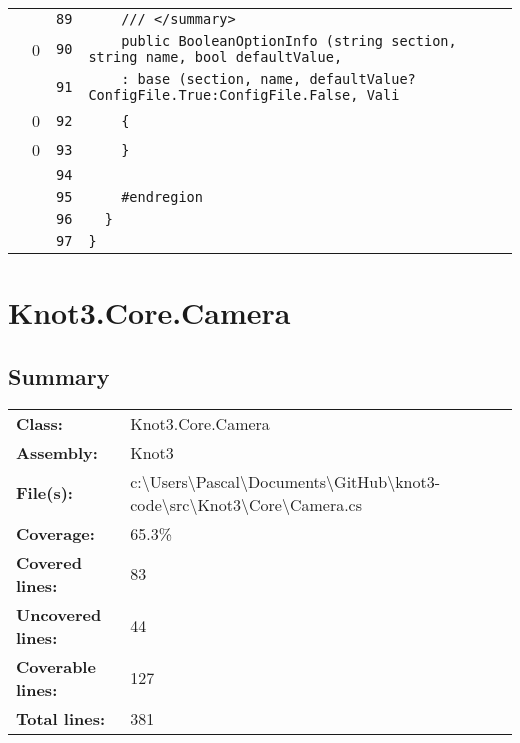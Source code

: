 \documentclass[a4paper,10pt]{article}
\begin{document}
\begin{longtable}[l]{lrrl}
\cellcolor{gray} &  & \verb~89~ & \verb~    /// </summary>~\\
\cellcolor{red} & 0 & \verb~90~ & \verb~    public BooleanOptionInfo (string section, string name, bool defaultValue, ~\\
\cellcolor{gray} &  & \verb~91~ & \verb~    : base (section, name, defaultValue?ConfigFile.True:ConfigFile.False, Vali~\\
\cellcolor{red} & 0 & \verb~92~ & \verb~    {~\\
\cellcolor{red} & 0 & \verb~93~ & \verb~    }~\\
\cellcolor{gray} &  & \verb~94~ & \verb~~\\
\cellcolor{gray} &  & \verb~95~ & \verb~    #endregion~\\
\cellcolor{gray} &  & \verb~96~ & \verb~  }~\\
\cellcolor{gray} &  & \verb~97~ & \verb~}~\\
\end{longtable}
\newpage
\section{Knot3.Core.Camera}
\subsection{Summary}
\begin{longtable}[l]{ll}
\textbf{Class:} & Knot3.Core.Camera\\
\textbf{Assembly:} & Knot3\\
\textbf{File(s):} & \begin{minipage}[t]{12cm}{c:\textbackslash Users\textbackslash Pascal\textbackslash Documents\textbackslash GitHub\textbackslash knot3-code\textbackslash src\textbackslash Knot3\textbackslash Core\textbackslash Camera.cs}\end{minipage} \\
\textbf{Coverage:} & 65.3\%\\
\textbf{Covered lines:} & 83\\
\textbf{Uncovered lines:} & 44\\
\textbf{Coverable lines:} & 127\\
\textbf{Total lines:} & 381\\
\end{longtable}
\end{document}
